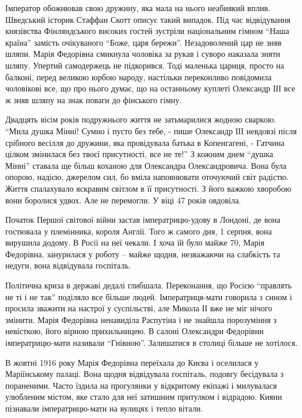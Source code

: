 Імператор обожнював свою дружину, яка мала на нього неабиякий вплив. Шведський
історик Стаффан Скотт описує такий випадок. Під час відвідування князівства
Фінляндського високих гостей зустріли національним гімном \enquote{Наша країна} замість
очікуваного \enquote{Боже, царя бережи}. Незадоволений цар не зняв шляпи. Марія
Федорівна смикнула чоловіка за рукав і суворо наказала зняти шляпу. Упертий
самодержець не підкорився. Тоді маленька цариця, просто на балконі, перед
великою юрбою народу, настільки переконливо повідомила чоловікові все, що про
нього думає, що на останньому куплеті Олександр ІІІ все ж зняв шляпу на знак
поваги до фінського гімну.

Двадцять вісім років подружнього життя не затьмарилися жодною сваркою. \enquote{Мила
душка Мінні! Сумно і пусто без тебе, - пише Олександр ІІІ невдовзі після
срібного весілля до дружини, яка провідувала батька в Копенгагені, - Гатчина
цілком змінилася без твоєї присутності, все не те!} З кожним днем \enquote{душка Мінні}
ставала ще більш коханою для Олександра Олександровича. Вона була опорою,
надією, джерелом сил, бо вміла наповнювати оточуючий світ радістю. Життя
спалахувало яскравим світлом в її присутності. З його важкою хворобою вони
боролися удвох. Але не перемогли. У віці 47 років овдовіла.

Початок Першої світової війни застав імператрицю-удову в Лондоні, де вона
гостювала у племінника, короля Англії. Того ж самого дня, 1 серпня, вона
вирушила додому. В Росії на неї чекали. І хоча їй було майже 70, Марія
Федорівна, занурилася у роботу – майже щодня, незважаючи на слабкість та
недуги, вона відвідувала госпіталь. 

Політична криза в державі дедалі глибшала. Переконання, що Росією \enquote{правлять не
ті і не так} поділяло все більше людей. Імператриця-мати говорила з сином і
просила зважити на настрої у суспільстві, але Микола ІІ вже не міг нічого
змінити. Марія Федорівна ненавиділа Распутіна і не знайшла порозуміння з
невісткою, його вірною прихильницею. В салоні Олександри Федорівни
імператрицю-мати  називали \enquote{Гнівною}. Залишатися в столиці більше не хотілося. 

В жовтні 1916 року Марія Федорівна переїхала до Києва і оселилася у
Маріїнському палаці. Вона щодня відвідувала госпіталь, подовгу бесідувала з
пораненими. Часто їздила на прогулянки у відкритому екіпажі і милувалася
улюбленим містом, яке стало для неї затишним притулком і відрадою. Кияни
пізнавали імператрицю-мати на вулицях і тепло вітали. 

